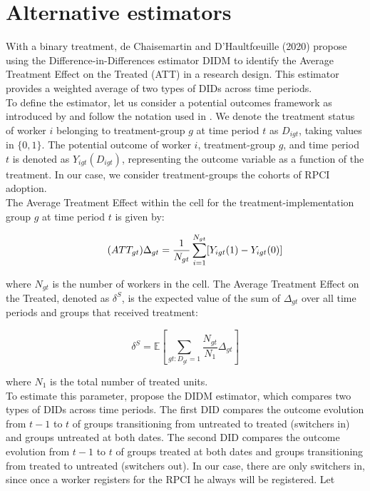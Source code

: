 \documentclass[10pt, oneside]{book}
\begin{document}
\section{Alternative estimators}

With a binary treatment, de Chaisemartin and D'Haultfœuille (2020) propose using the Difference-in-Differences estimator DIDM to identify the Average Treatment Effect on the Treated (ATT) in a research design. This estimator provides a weighted average of two types of DIDs across time periods. \\

To define the estimator, let us consider a potential outcomes framework as introduced by \cite{rubin1974estimating} and follow the notation used in \cite{de2020two}. We denote the treatment status of worker $i$ belonging to treatment-group $g$ at time period $t$ as $D_{igt}$, taking values in $\{0,1\}$. The potential outcome of worker $i$, treatment-group $g$, and time period $t$ is denoted as $Y_{igt}(D_{igt})$, representing the outcome variable as a function of the treatment. In our case, we consider treatment-groups the cohorts of RPCI adoption. \\

The Average Treatment Effect within the cell for the treatment-implementation group $g$ at time period $t$ is given by:

\begin{equation}
    \tag{$ATT_{gt}$}
    \Delta_{gt} = \frac{1}{N_{gt}} \sum_{i=1}^{N_{gt}} [Y_{igt}(1) - Y_{igt}(0)]
\end{equation}

where $N_{gt}$ is the number of workers in the cell. The Average Treatment Effect on the Treated, denoted as $\delta^{S}$, is the expected value of the sum of $\Delta_{gt}$ over all time periods and groups that received treatment:

\begin{equation}
    \tag{$ATT$}
    \delta^{S} = \mathbb{E}\left[\sum_{gt:D_{gt}=1} \frac{N_{gt}}{N_1} \Delta_{gt}\right]
\end{equation}

where $N_1$ is the total number of treated units. \\

To estimate this parameter, \cite{de2020two} propose the DIDM estimator, which compares two types of DIDs across time periods. The first DID compares the outcome evolution from $t-1$ to $t$ of groups transitioning from untreated to treated (switchers in) and groups untreated at both dates. The second DID compares the outcome evolution from $t-1$ to $t$ of groups treated at both dates and groups transitioning from treated to untreated (switchers out). In our case, there are only switchers in, since once a worker registers for the RPCI he always will be registered. Let
\end{document}
